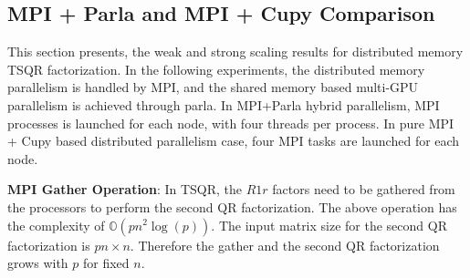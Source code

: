 \documentclass{article}
\begin{document}
\begin{table}[!tbhp]
    \begin{center}
    \end{center}
    \caption{Table presents the predicted MM runtime (see (\ref{eq:mm_sm})) based on the empirically compute bandwidths and flops/s for matrix rows of $\frac{m}{p} \times n$, where $p$ denotes the number of GPUs used for the actual computation. The difference between the predicted and the reported runtime grows with $\frac{m}{p}$. \label{tb:mm}}
\end{table}

\subsection{MPI + Parla  and MPI + Cupy Comparison}
This section presents, the weak and strong scaling results for distributed memory TSQR factorization. In the following experiments, the distributed memory parallelism is handled by MPI, and the shared memory based multi-GPU parallelism is achieved through parla. In MPI+Parla hybrid parallelism, MPI processes is launched for each node, with four threads per process. In pure MPI + Cupy based distributed parallelism case, four MPI tasks are launched for each node. 

\textbf{MPI Gather Operation}: In TSQR, the $R1r$ factors need to be gathered from the processors to perform the second QR factorization. The above operation has the complexity of $\mathbb{O}(pn^2\log(p))$. The input matrix size for the second QR factorization is $pn\times n$. Therefore the gather and the second QR factorization grows with $p$ for fixed $n$.
\end{document}
